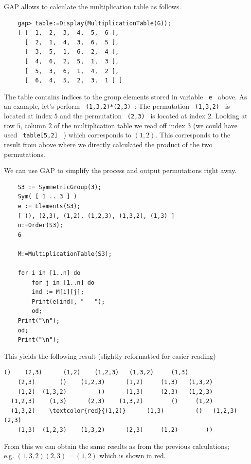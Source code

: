GAP allows to calculate the multiplication table as follows.

\begin{verbatim}
    gap> table:=Display(MultiplicationTable(G));
    [ [  1,  2,  3,  4,  5,  6 ],
      [  2,  1,  4,  3,  6,  5 ],
      [  3,  5,  1,  6,  2,  4 ],
      [  4,  6,  2,  5,  1,  3 ],
      [  5,  3,  6,  1,  4,  2 ],
      [  6,  4,  5,  2,  3,  1 ] ]
\end{verbatim}

The table contains indices to the group elements stored in variable \verb+ e + above. As an example, let's perform \verb+ (1,3,2)*(2,3) +: The permutation \verb+ (1,3,2) + is located at index $5$ and the permutation \verb+ (2,3) + is located at index $2$.  Looking at row $5$, column $2$ of the multiplication table we read off index $3$ (we could have used \verb+ table[5,2] + ) which corresponds to $(1,2)$. This corresponds to the result from above where we directly calculated the product of the two permutations.

We can use GAP to simplify the process and output permutations right away.

\begin{verbatim}
    S3 := SymmetricGroup(3);
    Sym( [ 1 .. 3 ] )
    e := Elements(S3);
    [ (), (2,3), (1,2), (1,2,3), (1,3,2), (1,3) ]
    n:=Order(S3);
    6

    M:=MultiplicationTable(S3);

    for i in [1..n] do
        for j in [1..n] do
        ind := M[i][j];
        Print(e[ind], "   ");
        od;
    Print("\n");
    od;
    Print("\n");
\end{verbatim}

This yields the following result (slightly reformatted for easier reading)

\begin{Verbatim}[commandchars=\\\{\}]
       ()    (2,3)      (1,2)    (1,2,3)   (1,3,2)     (1,3)
    (2,3)       ()    (1,2,3)      (1,2)     (1,3)   (1,3,2)
    (1,2)  (1,3,2)         ()      (1,3)     (2,3)   (1,2,3)
  (1,2,3)    (1,3)      (2,3)    (1,3,2)        ()     (1,2)
  (1,3,2)    \textcolor{red}{(1,2)}      (1,3)         ()   (1,2,3)     (2,3)
    (1,3)  (1,2,3)    (1,3,2)      (2,3)     (1,2)        ()
\end{Verbatim}

From this we can obtain the same results as from the previous calculations; \\ e.g. $(1,3,2)(2,3) = (1,2)$ which is shown in red.

